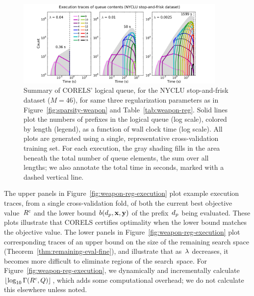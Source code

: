 \begin{figure}[t!]
\begin{center}
\includegraphics[trim={30mm 0mm 30mm 3mm},
width=0.92\textwidth]{figs/weapon_reg-queue.pdf}
\end{center}
\vspace{-5mm}
\caption{Summary of CORELS' logical queue,
for the NYCLU stop-and-frisk dataset (${M = 46}$),
for same three regularization parameters as in Figure~\ref{fig:sparsity-weapon}
and Table~\ref{tab:weapon-reg}.
%
Solid lines plot the numbers of prefixes in the logical queue (log scale), colored by length (legend),
as a function of wall clock time (log scale).
%
All plots are generated using a single, representative cross-validation training set.
%
For each execution, the gray shading fills in the area beneath the total number
of queue elements, \ie the sum over all lengths;
we also annotate the total time in seconds, marked with a dashed vertical line.
}
\label{fig:queue-weapon-reg}
\end{figure}

The upper panels in Figure~\ref{fig:weapon-reg-execution} plot example execution traces,
from a single cross-validation fold, of both the current best objective value~${R^c}$
and the lower bound~$b(d_p, \mathbf{x}, \mathbf{y})$ of the prefix~$d_p$ being evaluated.
%
These plots illustrate that CORELS certifies optimality
when the lower bound matches the objective value.
%
The lower panels in Figure~\ref{fig:weapon-reg-execution} plot corresponding traces of
an upper bound on the size of the remaining search space (Theorem~\ref{thm:remaining-eval-fine}),
and illustrate that as~${\lambda}$ decreases, it becomes more difficult to eliminate regions of the search~space.
%
For Figure~\ref{fig:weapon-reg-execution}, we dynamically and incrementally
calculate~$\lfloor \log_{10} \Gamma({R^c}, Q) \rfloor$,
which adds some computational overhead; we do not calculate this elsewhere unless noted.

